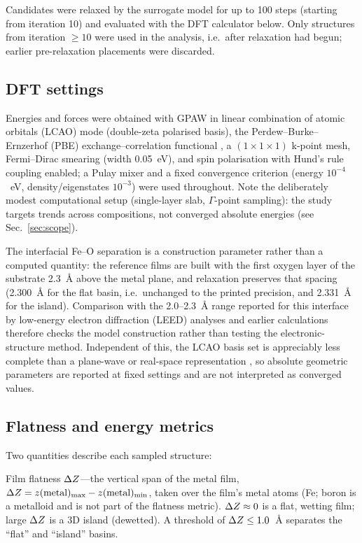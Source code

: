 Candidates were relaxed by the surrogate model for up to 100 steps (starting from iteration 10) and
evaluated with the DFT calculator below. Only structures from iteration $\ge 10$ were used in
the analysis, i.e.\ after relaxation had begun; earlier pre-relaxation placements were discarded.

\subsection{DFT settings}
\label{sec:dft}

Energies and forces were obtained with GPAW \cite{gpaw2014} in linear combination of atomic orbitals
(LCAO) mode (double-zeta polarised basis), the Perdew--Burke--Ernzerhof (PBE) exchange--correlation
functional \cite{pbe1996}, a $(1\times1\times1)$ k-point mesh,
Fermi--Dirac smearing (width 0.05~eV), and spin polarisation with Hund's rule coupling enabled; a
Pulay mixer and a fixed convergence criterion (energy $10^{-4}$~eV, density/eigenstates $10^{-3}$)
were used throughout. Note the deliberately modest computational setup (single-layer slab,
$\Gamma$-point sampling): the study targets trends across compositions, not converged
absolute energies (see Sec.~\ref{sec:scope}).

The interfacial Fe--O separation is a construction parameter rather than a computed
quantity: the reference films are built with the first oxygen layer of the substrate 2.3~\AA{} above
the metal plane, and relaxation preserves that spacing (2.300~\AA{} for the flat basin, i.e.\
unchanged to the printed precision, and 2.331~\AA{} for the island). Comparison with the 2.0--2.3~\AA{}
range reported for this interface by low-energy electron diffraction (LEED) analyses and earlier
calculations
\cite{urano1988,butler2001} therefore checks the model construction rather than testing the
electronic-structure method. Independent of this, the LCAO basis set is appreciably less complete
than a plane-wave or real-space representation \cite{larsen2009}, so absolute geometric parameters
are reported at fixed settings and are not interpreted as converged values.

\subsection{Flatness and energy metrics}
\label{sec:metrics}

Two quantities describe each sampled structure:

Film flatness $\Delta Z$---the vertical span of the metal film,
$\Delta Z = z(\text{metal})_\text{max} - z(\text{metal})_\text{min}$, taken over the film's
metal atoms (Fe; boron is a metalloid and is not part of the flatness metric).
$\Delta Z \approx 0$ is a flat, wetting film; large $\Delta Z$ is a 3D island (dewetted). A threshold of
$\Delta Z \le 1.0$~\AA{} separates the ``flat'' and ``island'' basins.

